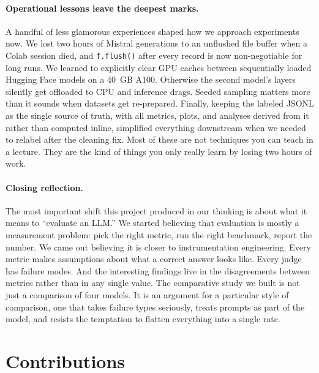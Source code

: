 \documentclass[11pt,a4paper]{article}
\begin{document}
\paragraph{Operational lessons leave the deepest marks.} A handful of less glamorous experiences shaped how we approach experiments now. We lost two hours of Mistral generations to an unflushed file buffer when a Colab session died, and \texttt{f.flush()} after every record is now non-negotiable for long runs. We learned to explicitly clear GPU caches between sequentially loaded Hugging Face models on a 40~GB A100. Otherwise the second model's layers silently get offloaded to CPU and inference drags. Seeded sampling matters more than it sounds when datasets get re-prepared. Finally, keeping the labeled JSONL as the single source of truth, with all metrics, plots, and analyses derived from it rather than computed inline, simplified everything downstream when we needed to relabel after the cleaning fix. Most of these are not techniques you can teach in a lecture. They are the kind of things you only really learn by losing two hours of work.

\paragraph{Closing reflection.} The most important shift this project produced in our thinking is about what it means to ``evaluate an LLM.'' We started believing that evaluation is mostly a measurement problem: pick the right metric, run the right benchmark, report the number. We came out believing it is closer to instrumentation engineering. Every metric makes assumptions about what a correct answer looks like. Every judge has failure modes. And the interesting findings live in the disagreements between metrics rather than in any single value. The comparative study we built is not just a comparison of four models. It is an argument for a particular style of comparison, one that takes failure types seriously, treats prompts as part of the model, and resists the temptation to flatten everything into a single rate.

\section{Contributions}
\end{document}
